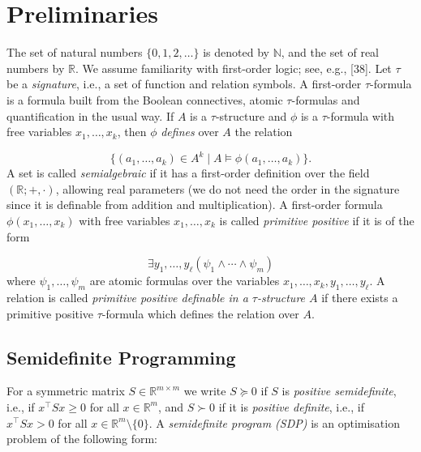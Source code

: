 \documentclass[10pt,a4paper]{article}
\theoremstyle{definition}
\begin{document}
\section*{Preliminaries}

The set of natural numbers $\{0,1,2,\dots\}$ is denoted by ${\mathbb{N}}$, and the set of real numbers by ${\mathbb{R}}$. We assume familiarity with first-order logic; see, e.g., [38]. Let $\tau$ be a \emph{signature}, i.e., a set of function and relation symbols. A first-order $\tau$-formula is a formula built from the Boolean connectives, atomic $\tau$-formulas and quantification in the usual way. If $A$ is a $\tau$-structure and $\phi$ is a $\tau$-formula with free variables $x_{1},\dots,x_{k}$, then $\phi$ \emph{defines} over $A$ the relation


\[
\{(a_{1},\dots,a_{k})\in A^{k}\mid A\models\phi(a_{1},\dots,a_{k})\}.
\]
A set is called \emph{semialgebraic} if it has a first-order definition over the field $({\mathbb{R}};+,\cdot)$, allowing real parameters (we do not need the order in the signature since it is definable from addition and multiplication). A first-order formula $\phi(x_{1},\dots,x_{k})$ with free variables $x_{1},\dots,x_{k}$ is called \emph{primitive positive} if it is of the form


\[
\exists y_{1},\dots,y_{\ell}(\psi_{1}\wedge\cdots\wedge\psi_{m})
\]
where $\psi_{1},\dots,\psi_{m}$ are atomic formulas over the variables $x_{1},\dots,x_{k},y_{1},\dots,y_{\ell}$. A relation is called \emph{primitive positive definable in a $\tau$-structure $A$} if there exists a primitive positive $\tau$-formula which defines the relation over $A$.

\subsection*{Semidefinite Programming}

For a symmetric matrix $S\in{\mathbb{R}}^{m\times m}$ we write $S\succeq 0$ if $S$ is \emph{positive semidefinite}, i.e., if $x^{\top}Sx\geq 0$ for all $x\in{\mathbb{R}}^{m}$, and $S\succ 0$ if it is \emph{positive definite}, i.e., if $x^{\top}Sx>0$ for all $x\in{\mathbb{R}}^{m}\setminus\{0\}$. A \emph{semidefinite program (SDP)} is an optimisation problem of the following form:
\end{document}
